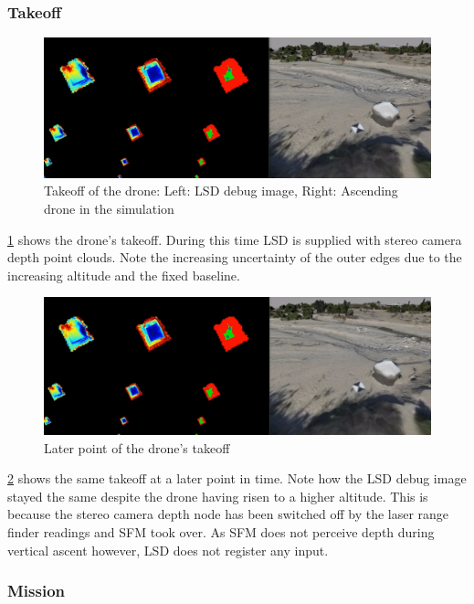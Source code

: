 \subsubsection{Takeoff}

\begin{figure}[h]
\centering
\includegraphics[scale=0.25]{images/autonomous_landing/demo_flight/takeoff1.png}
\caption{Takeoff of the drone: Left: LSD debug image, Right: Ascending drone in the simulation}
\label{fig:demo_takeoff1}
\end{figure}

\cref{fig:demo_takeoff1} shows the drone's takeoff. During this time LSD is supplied with stereo camera depth point clouds. Note the increasing uncertainty of the outer edges due to the increasing altitude and the fixed baseline.

\begin{figure}[h]
\centering
\includegraphics[scale=0.25]{images/autonomous_landing/demo_flight/takeoff2.png}
\caption{Later point of the drone's takeoff}
\label{fig:demo_takeoff2}
\end{figure}

\cref{fig:demo_takeoff2} shows the same takeoff at a later point in time. Note how the LSD debug image stayed the same despite the drone having risen to a higher altitude. This is because the stereo camera depth node has been switched off by the laser range finder readings and SFM took over. As SFM does not perceive depth during vertical ascent however, LSD does not register any input.

\subsubsection{Mission}

